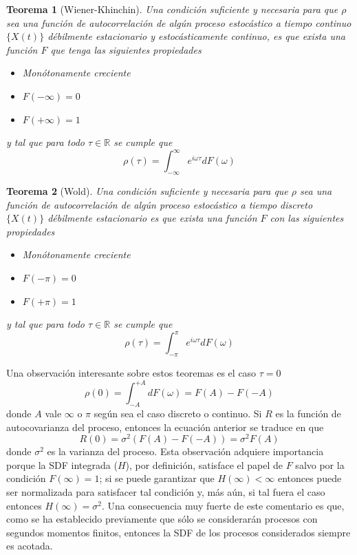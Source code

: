 \documentclass[12pt,a4paper]{mitthesis}
\newtheorem{thrm}{Teorema}
\newcommand{\R}{\mathbb{R}}
\newcommand{\intR}{\int_{-\infty}^{\infty}}
\newcommand{\intPI}{\int_{-\pi}^{\pi}}
\begin{document}
\begin{thrm}[Wiener-Khinchin]
Una condici\'on suficiente y necesaria para que $\rho$ sea una funci\'on de autocorrelaci\'on de 
alg\'un proceso estoc\'astico a tiempo continuo $\{X(t)\}$ d\'ebilmente estacionario y 
estoc\'asticamente continuo, es que exista una funci\'on $F$ que tenga las siguientes propiedades
\begin{itemize}
\item Mon\'otonamente creciente
\item $F(-\infty) = 0$
\item $F(+\infty) = 1$
\end{itemize}
y tal que para todo $\tau \in \R$ se cumple que
\begin{equation*}
\rho(\tau) = \intR e^{i \omega \tau} dF(\omega)
\end{equation*}
\label{t_wienerkhinchin}
\end{thrm}

\begin{thrm}[Wold]
Una condici\'on suficiente y necesaria para que $\rho$ sea una funci\'on de autocorrelaci\'on de 
alg\'un proceso estoc\'astico a tiempo discreto $\{X(t)\}$ d\'ebilmente estacionario es que exista 
una funci\'on $F$ con las siguientes propiedades
\begin{itemize}
\item Mon\'otonamente creciente
\item $F(-\pi) = 0$
\item $F(+\pi) = 1$
\end{itemize}
y tal que para todo $\tau \in \R$ se cumple que
\begin{equation*}
\rho(\tau) = \intPI e^{i \omega \tau} dF(\omega)
\end{equation*}
\label{t_wold}
\end{thrm}

Una observaci\'on interesante sobre estos teoremas es el caso $\tau = 0$
\begin{equation*}
\rho(0) = \int_{-A}^{+A} dF(\omega) = F(A) - F(-A)
\end{equation*}
donde $A$ vale $\infty$ o $\pi$ seg\'un sea el caso discreto o continuo. Si $R$ es la funci\'on de
autocovarianza del proceso, entonces la ecuaci\'on anterior se traduce en que
\begin{equation*}
R(0) = \sigma^{2} \left( F(A) - F(-A) \right) = \sigma^{2} F(A)
\end{equation*}
donde $\sigma^{2}$ es la varianza del proceso. 
Esta observaci\'on adquiere importancia porque la SDF integrada ($H$), por definici\'on, satisface 
el papel de $F$ salvo por la condici\'on $F(\infty)=1$; si se puede garantizar que 
$H(\infty)<\infty$ entonces puede ser normalizada para satisfacer tal condici\'on y, m\'as a\'un,
si tal fuera el caso entonces $H(\infty)=\sigma^{2}$. Una consecuencia muy fuerte de este 
comentario es que, como se ha establecido previamente que s\'olo se considerar\'an procesos con
segundos momentos finitos, entonces la SDF de los procesos considerados siempre es acotada.
\end{document}
